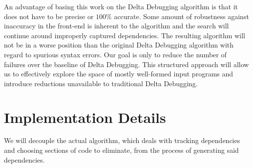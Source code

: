 \documentclass[11pt]{article}
\begin{document}
An advantage of basing this work on the Delta Debugging algorithm is that it
does not have to be precise or $100 \%$ accurate. Some amount of robustness
against inaccuracy in the front-end is inherent to the algorithm and the search
will continue around improperly captured dependencies.  The resulting algorithm
will not be in a worse position than the original Delta Debugging algorithm with
regard to spurious syntax errors.  Our goal is only to reduce the number of
failures over the baseline of Delta Debugging. This structured approach will
allow us to effectively explore the space of mostly well-formed input programs
and introduce reductions unavailable to traditional Delta Debugging.


\section{Implementation Details}
We will decouple the actual algorithm, which deals with tracking dependencies
and choosing sections of code to eliminate, from the process of generating said
dependencies.
\end{document}
